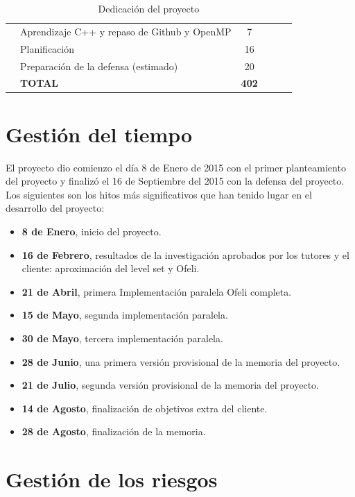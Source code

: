 \begin{table}[H]
\begin{tabular}{clcp{20mm}p{20mm}M{20mm}}
        & Aprendizaje C++ y repaso de Github y OpenMP  			& 7                    \\ \cmidrule(l){2-3}
        & Planificaci\'{o}n 								& 16 \\ \cmidrule(l){2-3}
        & Preparaci\'{o}n de la defensa (estimado)         		& 20                   \\ \midrule \midrule
        & \bf{TOTAL}            & \textbf{402} \\ \midrule                
	\end{tabular}
	\caption{Dedicaci\'{o}n del proyecto}	
	\label{dedicacionTemporal}	
\end{table}




\section{Gesti\'{o}n del tiempo}

El proyecto dio comienzo el d\'{i}a 8 de Enero de 2015 con el primer planteamiento del proyecto y finaliz\'{o} el 16 de Septiembre del 2015 con la defensa del proyecto. Los siguientes son los hitos m\'{a}s significativos que han tenido lugar en el desarrollo del proyecto:
 
\begin{itemize}
	\item \textbf{8 de Enero}, inicio del proyecto.
	\item \textbf{16 de Febrero},  resultados de la investigaci\'{o}n aprobados por los tutores y el cliente: aproximaci\'{o}n del level set y Ofeli.
	\item \textbf{21 de Abril}, primera Implementaci\'{o}n paralela Ofeli completa.
	\item \textbf{15 de Mayo}, segunda implementaci\'{o}n paralela.
	\item \textbf{30 de Mayo}, tercera implementaci\'{o}n paralela.
	\item \textbf{28 de Junio}, una primera versi\'{o}n provisional de la memoria del proyecto.
	\item \textbf{21 de Julio}, segunda versi\'{o}n provisional de la memoria del proyecto.
	\item \textbf{14 de Agosto}, finalizaci\'{o}n de objetivos extra del cliente.
	\item \textbf{28 de Agosto}, finalizaci\'{o}n de la memoria.
\end{itemize}




\section{Gesti\'{o}n de los riesgos}\label{riesgos}

